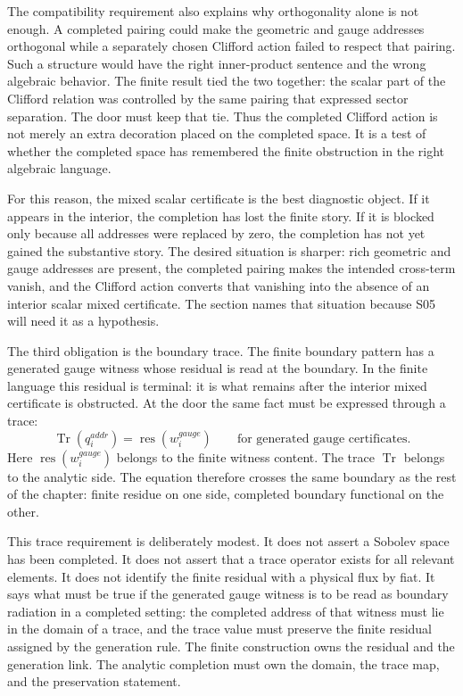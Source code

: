 The compatibility requirement also explains why orthogonality alone is not
enough. A completed pairing could make the geometric and gauge addresses
orthogonal while a separately chosen Clifford action failed to respect that
pairing. Such a structure would have the right inner-product sentence and the
wrong algebraic behavior. The finite result tied the two together: the scalar
part of the Clifford relation was controlled by the same pairing that expressed
sector separation. The door must keep that tie. Thus the completed Clifford
action is not merely an extra decoration placed on the completed space. It is a
test of whether the completed space has remembered the finite obstruction in
the right algebraic language.

For this reason, the mixed scalar certificate is the best diagnostic object. If
it appears in the interior, the completion has lost the finite story. If it is
blocked only because all addresses were replaced by zero, the completion has
not yet gained the substantive story. The desired situation is sharper: rich
geometric and gauge addresses are present, the completed pairing makes the
intended cross-term vanish, and the Clifford action converts that vanishing
into the absence of an interior scalar mixed certificate. The section names
that situation because S05 will need it as a hypothesis.

The third obligation is the boundary trace. The finite boundary pattern has a
generated gauge witness whose residual is read at the boundary.
In the finite language this residual is terminal: it is what remains after the
interior mixed certificate is obstructed. At the door the same fact must be
expressed through a trace:
\[
  \operatorname{Tr}(q_i^{addr}) =
  \operatorname{res}(w_i^{gauge})
  \qquad\text{for generated gauge certificates.}
\]
Here \(\operatorname{res}(w_i^{gauge})\) belongs to the finite witness content.
The trace \(\operatorname{Tr}\) belongs to the analytic side. The equation
therefore crosses the same boundary as the rest of the chapter: finite residue
on one side, completed boundary functional on the other.

This trace requirement is deliberately modest. It does not assert a Sobolev
space has been completed. It does not assert that a trace operator exists for
all relevant elements. It does not identify the finite residual with a
physical flux by fiat. It says what must be true if the generated gauge witness
is to be read as boundary radiation in a completed setting: the completed
address of that witness must lie in the domain of a trace, and the trace value
must preserve the finite residual assigned by the generation rule. The finite
construction owns the residual and the generation link. The analytic
completion must own the domain, the trace map, and the preservation statement.

